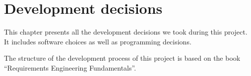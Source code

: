 \chapter{Development decisions}\label{ch:dev_dec}

This chapter presents all the development decisions we took during this
project. It includes software choices as well as programming decisions.

The structure of the development process of this project is based on the book
``Requirements Engineering Fundamentals''\cite{pohl2011requirements}.
















